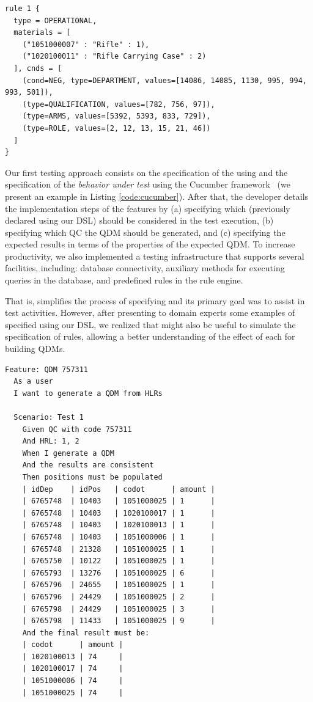 \begin{small}
	\begin{lstlisting}[frame=single, language=DSL, caption={\it Example of a \shc declaration using our DSL}, label={code:dslExample}]
rule 1 { 
  type = OPERATIONAL, 
  materials = [ 
    ("1051000007" : "Rifle" : 1), 
    ("1020100011" : "Rifle Carrying Case" : 2)
  ], cnds = [ 
    (cond=NEG, type=DEPARTMENT, values=[14086, 14085, 1130, 995, 994, 993, 501]),
    (type=QUALIFICATION, values=[782, 756, 97]), 
    (type=ARMS, values=[5392, 5393, 833, 729]), 
    (type=ROLE, values=[2, 12, 13, 15, 21, 46])
  ]
}
	\end{lstlisting}
\end{small}

Our first testing approach consists on the specification of the \callers using \hlrdsl and the specification of the
\emph{behavior under test} using the Cucumber framework~\cite{wynne2017cucumber} (we present an example in Listing \ref{code:cucumber}).
After that, the developer details the implementation steps of the features by (a) specifying which
\callers (previously declared using our DSL) should be considered in the test execution, (b) specifying
which QC the QDM should be generated, and (c) specifying the expected results in terms of the properties
of the expected QDM. To increase productivity, we also implemented a testing  infrastructure that supports several facilities,
including: database connectivity, auxiliary methods for executing queries in the database, and predefined
rules in the rule engine.

That is, \hlrdsl simplifies the process of specifying \callers and its primary goal was to assist in
test activities. However, after presenting to domain experts some examples of \callers specified using our DSL,
we realized that \hlrdsl might also be useful to simulate the specification of rules,
allowing a better understanding of the effect of each \shc for building QDMs.

\begin{lstlisting}[frame=single, language=Cucumber, caption={\it Cucumber feature}, label={code:cucumber}]
Feature: QDM 757311
  As a user
  I want to generate a QDM from HLRs

  Scenario: Test 1
    Given QC with code 757311
    And HRL: 1, 2
    When I generate a QDM
    And the results are consistent
    Then positions must be populated
    | idDep    | idPos   | codot      | amount |
    | 6765748  | 10403   | 1051000025 | 1      |
    | 6765748  | 10403   | 1020100017 | 1      |
    | 6765748  | 10403   | 1020100013 | 1      |
    | 6765748  | 10403   | 1051000006 | 1      |
    | 6765748  | 21328   | 1051000025 | 1      |
    | 6765750  | 10122   | 1051000025 | 1      |    
    | 6765793  | 13276   | 1051000025 | 6      |
    | 6765796  | 24655   | 1051000025 | 1      |
    | 6765796  | 24429   | 1051000025 | 2      |
    | 6765798  | 24429   | 1051000025 | 3      |
    | 6765798  | 11433   | 1051000025 | 9      |   
    And the final result must be:
    | codot      | amount |
    | 1020100013 | 74     |
    | 1020100017 | 74     |
    | 1051000006 | 74     |
    | 1051000025 | 74     |
\end{lstlisting}

